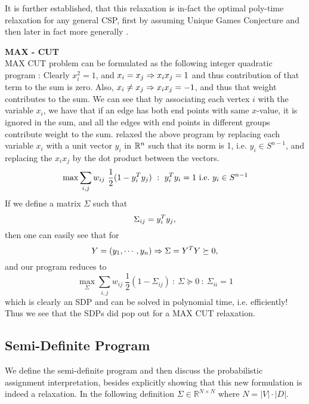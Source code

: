 It is further established, that this relaxation is in-fact the optimal poly-time relaxation for any general CSP, first by assuming Unique Games Conjecture \cite{Khot} and then later in fact more generally \cite{nphard}. 

\begin{example}{\bf MAX - CUT}\label{maxcut}\\
MAX CUT problem can be formulated as the following integer quadratic program : 
Clearly $x_i^2=1$, and $x_i=x_j\Rightarrow x_ix_j=1$ and thus contribution of that term to the sum is zero. 
Also, $x_i \neq x_j \Rightarrow x_ix_j=-1$, and thus that weight contributes to the sum. 
We can see that by associating each vertex $i$ with the variable $x_i$, we have that if an edge has both end points with same $x$-value, it is ignored in the sum, and all the edges with end points in different groups contribute weight to the sum. 
\cite{delormecombinatorial} relaxed the above program by replacing each variable $x_i$ with a unit vector $y_i$ in $\mathbb{R}^n$ such that its norm is 1, i.e. $y_i \in S^{n-1}$, and replacing the $x_ix_j$ by the dot product between the vectors. 
\[ \max \sum_{i,j} w_{ij} \ \frac{1}{2}(1-y_i^T y_j) ~:~ y_i^T y_i = 1 {\mbox {\ i.e.\ }} y_i \in S^{n-1} \]
If we define a matrix $\Sigma$ such that $$\Sigma_{ij} = y_i^T y_j,$$ then one can easily see that for $$Y = (y_1, \cdots, y_n) \Rightarrow \Sigma = Y^T Y \succeq 0,$$ and our program reduces to 
\[ \max_\Sigma \sum_{i,j} w_{ij} \ \frac{1}{2}(1-\Sigma_{ij}) ~:~ \Sigma \succeq 0 ~:~ \Sigma_{ii} = 1  \]
which is clearly an SDP and can be solved in polynomial time, i.e. efficiently! 
Thus we see that the SDPs did pop out for a MAX CUT relaxation.
\end{example}

\subsection{Semi-Definite Program}
We define the semi-definite program and then discuss the probabilistic assignment interpretation, besides explicitly showing that this new formulation is indeed a relaxation. In the following definition $\Sigma \in \mathbb{R}^{N \times N}$ where $N = |V| \cdot |D|$.

